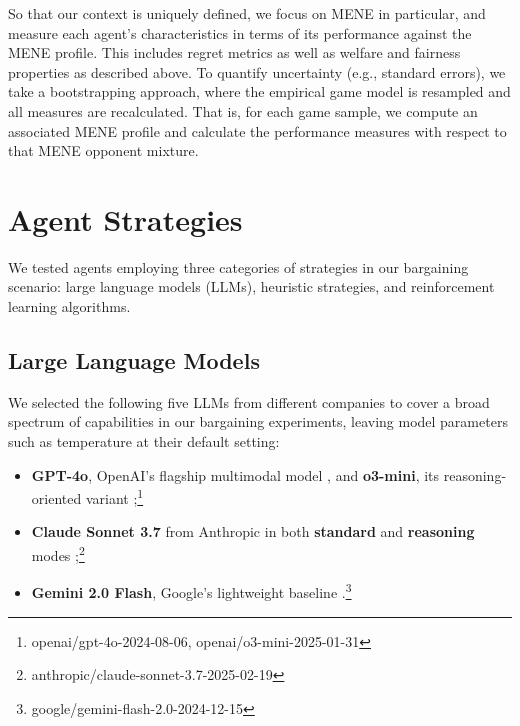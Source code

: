\documentclass{article}
\theoremstyle{plain}
\theoremstyle{definition}
\theoremstyle{remark}
\begin{document}
So that our context is uniquely defined, we focus on MENE in particular, and measure each agent's characteristics in terms of its performance against the MENE profile. 
This includes regret metrics as well as welfare and fairness properties as described above.
To quantify uncertainty (e.g., standard errors), we take a bootstrapping approach, where the empirical game model is resampled and all measures are recalculated.
That is, for each game sample, we compute an associated MENE profile and calculate the performance measures with respect to that MENE opponent mixture.

\section{Agent Strategies}\label{sec:agent_strat}
We tested agents employing three categories of strategies in our bargaining scenario: large language models (LLMs), heuristic strategies, and reinforcement learning algorithms.

\subsection{Large Language Models}
We selected the following five LLMs from different companies to cover a broad spectrum of capabilities in our bargaining experiments, leaving model parameters such as temperature at their default setting:
\begin{itemize}
    \item \textbf{GPT-4o},  OpenAI’s flagship multimodal model \citep{openai2024gpt4o}, and \textbf{o3-mini}, its reasoning-oriented variant \citep{openai2025o3};\footnote{openai/gpt-4o-2024-08-06, openai/o3-mini-2025-01-31} %
    \item \textbf{Claude Sonnet 3.7} from Anthropic in both \textbf{standard} and \textbf{reasoning} modes \citep{anthropic2024claude3};\footnote{anthropic/claude-sonnet-3.7-2025-02-19} %
    \item \textbf{Gemini 2.0 Flash},  Google’s lightweight baseline \citep{anil2023gemini}.\footnote{google/gemini-flash-2.0-2024-12-15} %
\end{itemize}
  
\end{document}
